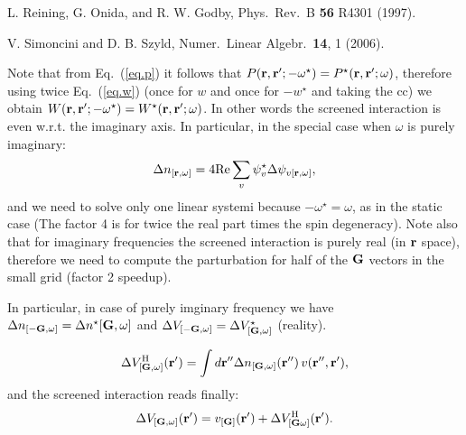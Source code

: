\documentclass[twocolumn,prb,showpacs,superscriptaddress]{revtex4}
\def\w{\omega}
\def\G{{\bf G}}
\def\r{{\bf r}}
\def\rp{{\bf r^\prime}}
\def\rpp{{\bf r^{\prime\prime}}}
\begin{document}
\begin{thebibliography}{99}
L. Reining, G. Onida, and R. W. Godby, 
Phys.\ Rev.\ B {\bf 56} R4301 (1997).

V. Simoncini and D. B. Szyld,
Numer.\ Linear Algebr.\ {\bf 14}, 1 (2006).

Note that from Eq.\ (\ref{eq.p}) it follows that $P(\r,\rp;-\w^\star)=P^\star(\r,\rp;\w)$,
therefore using twice Eq.\ (\ref{eq.w}) (once for $w$ and once for $-w^\star$ and taking
the cc) we obtain $W(\r,\rp;-\w^\star)=W^\star(\r,\rp;\w)$. In other words
the screened interaction is even w.r.t. the imaginary axis.
In particular, in the special case when $\w$ is purely imaginary:
  \begin{equation}
  \Delta n_{[\r,\w]} = 4 {\rm Re} \sum_v \psi_v^\star \Delta \psi_{v[\r,\w]},
  \end{equation}
and we need to solve only one linear systemi because $-\w^\star=\w$,
as in the static case (The factor 4 is for twice the real part times the spin degeneracy).
Note also that for imaginary frequencies the screened interaction is purely real
(in $\r$ space), therefore we need to compute the parturbation for half of the $\G$ vectors in
the small grid (factor 2 speedup).

In particular, in case of purely imginary frequency we have 
$\Delta n_{[-\G,\w]}=\Delta n^\star{[\G,\w]}$ and $\Delta V_{[-\G,\w]}=\Delta V^\star_{[\G,\w]}$
(reality).


  \begin{equation}
  \Delta V^{\rm H}_{[\G,\w]}(\rp) = \int d\rpp \Delta n_{[\G,\w]}(\rpp) \, v(\rpp,\rp),
  \end{equation}
and the screened interaction reads finally:
  \begin{equation}
  \Delta V_{[\G,\w]}(\rp) = v_{[\G]}(\rp) + \Delta V^{\rm H}_{[\G\w]}(\rp).
  \end{equation}

\end{thebibliography}
\end{document}
